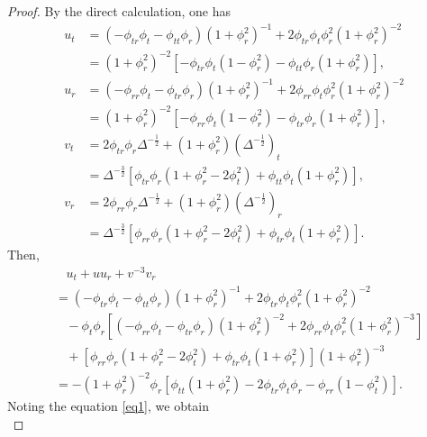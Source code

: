 \documentclass[10pt,leqno]{amsart}
\numberwithin{equation}{section}
\begin{document}
\begin{proof}
	By the direct calculation, one has
	\begin{equation*}
		\begin{aligned}
			u_{t} &= (-\phi_{tr} \phi_{t}-\phi_{tt} \phi_{r}) (1+\phi_{r}^{2})^{-1} +2 \phi_{tr} \phi_{t} \phi_{r}^{2} (1+\phi_{r}^{2})^{-2} \\
			&= (1+\phi_{r}^{2})^{-2} [ - \phi_{tr}\phi_{t} (1-\phi_{r}^{2}) - \phi_{tt} \phi_{r}(1+\phi_{r}^{2})], \\
			u_{r} &= (-\phi_{rr} \phi_{t}-\phi_{tr} \phi_{r}) (1+\phi_{r}^{2})^{-1} + 2 \phi_{rr} \phi_{t} \phi_{r}^{2} (1+\phi_{r}^{2})^{-2}\\
			&= (1+\phi_{r}^{2})^{-2} [ - \phi_{rr}\phi_{t} (1-\phi_{r}^{2}) - \phi_{tr} \phi_{r}(1+\phi_{r}^{2})], \\
			v_{t} &= 2 \phi_{tr} \phi_{r} \Delta^{-\frac{1}{2}} +  (1+\phi_{r}^{2}) (\Delta^{-\frac{1}{2}})_{t} \\
			&= \Delta^{-\frac{3}{2}} [ \phi_{tr} \phi_{r} ( 1+\phi_{r}^{2} - 2 \phi_{t}^{2} ) + \phi_{tt} \phi_{t} (1+\phi_{r}^{2}) ], \\
			v_{r} &= 2 \phi_{rr} \phi_{r} \Delta^{-\frac{1}{2}} +  (1+\phi_{r}^{2}) (\Delta^{-\frac{1}{2}})_{r} \\
			&= \Delta^{-\frac{3}{2}} [ \phi_{rr} \phi_{r} ( 1+\phi_{r}^{2} - 2 \phi_{t}^{2} ) + \phi_{tr} \phi_{t} (1+\phi_{r}^{2}) ]. 
		\end{aligned}
	\end{equation*}
	Then,
	\begin{equation*}
		\begin{aligned}
			&\ \ \ \ u_{t} + uu_{r} + v^{-3}v_{r} \\
			&= (-\phi_{tr} \phi_{t}-\phi_{tt} \phi_{r}) (1+\phi_{r}^{2})^{-1} + 2 \phi_{tr} \phi_{t} \phi_{r}^{2} (1+\phi_{r}^{2})^{-2} \\
			& \ \ \ \ - \phi_{t} \phi_{r} [(-\phi_{rr} \phi_{t}-\phi_{tr} \phi_{r}) (1+\phi_{r}^{2})^{-2} + 2 \phi_{rr} \phi_{t} \phi_{r}^{2} (1+\phi_{r}^{2})^{-3}] \\
			& \ \ \ \ + [ \phi_{rr} \phi_{r} ( 1+\phi_{r}^{2} - 2 \phi_{t}^{2} ) + \phi_{tr} \phi_{t} (1+\phi_{r}^{2}) ](1+\phi_{r}^{2})^{-3} \\
			&= -(1+\phi_{r}^{2})^{-2} \phi_{r} [ \phi_{tt}(1+\phi_{r}^{2}) - 2\phi_{tr} \phi_{t}\phi_{r} - \phi_{rr}(1-\phi_{t}^{2}) ].
		\end{aligned}
	\end{equation*}
	Noting the equation \eqref{eq1}, we obtain
	\begin{equation*}

\end{equation*}
\end{proof}
\end{document}
